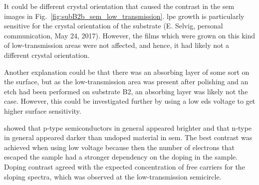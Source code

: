 It could be different crystal orientation that caused the contrast in the \ac{sem} images in Fig.~\ref{fig:subB2b_sem_low_transmission}. \Ac{lpe} growth is particularly sensitive for the crystal orientation of the substrate (E. Selvig, personal communication, May 24, 2017). However, the films which were grown on this kind of low-transmission areas were not affected, and hence, it had likely not a different crystal orientation.

Another explanation could be that there was an absorbing layer of some sort on the surface, but as the low-transmission area was present after polishing and an etch had been performed on substrate B2, an absorbing layer was likely not the case. However, this could be investigated further by using a low \ac{eds} voltage to get higher surface sensitivity.

\citet{sealy2000mechanism} showed that p-type semiconductors in general appeared brighter and that n-type in general appeared darker than undoped material in \ac{sem}. The best contrast was achieved when using low voltage because then the number of electrons that escaped the sample had a stronger dependency on the doping in the sample. Doping contrast agreed with the expected concentration of free carriers for the sloping spectra, which was observed at the low-transmission semicircle.

